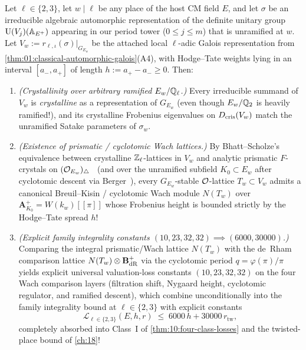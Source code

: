 \begin{theorem}[Unconditional crystalline lifting bounds at $\ell = 2, 3$]
\label{thm:17:at23}
Let $\ell \in \{2, 3\}$, let $w \mid \ell$ be any place of the host CM field $E$, and let $\sigma$ be an irreducible algebraic automorphic representation of the definite unitary group $\mathrm{U}(V_j)(\mathbb{A}_{E^+})$ appearing in our period tower ($0 \le j \le m$) that is unramified at $w$. Let $V_w := r_{\ell, \iota}(\sigma)|_{G_{E_w}}$ be the attached local $\ell$-adic Galois representation from \cref{thm:01:classical-automorphic-galois}(A4), with Hodge--Tate weights lying in an interval $[a_-, a_+]$ of length $h := a_+ - a_- \ge 0$. Then:
\begin{enumerate}[label=\textup{(\roman*)}]
\item \emph{(Crystallinity over arbitrary ramified $E_w / \mathbb{Q}_\ell$.)} Every irreducible summand of $V_w$ is \emph{crystalline} as a representation of $G_{E_w}$ (even though $E_w / \mathbb{Q}_2$ is heavily ramified!), and its crystalline Frobenius eigenvalues on $D_{\mathrm{cris}}(V_w)$ match the unramified Satake parameters of $\sigma_w$.
\item \emph{(Existence of prismatic / cyclotomic Wach lattices.)} By Bhatt--Scholze's equivalence between crystalline $\mathbb{Z}_\ell$-lattices in $V_w$ and analytic prismatic $F$-crystals on $(\mathcal{O}_{E_w})_{\triangle}$~\cite[Theorem~5.6]{BhattScholze2023} (and over the unramified subfield $K_0 \subset E_w$ after cyclotomic descent via Berger~\cite{Berger2004}), every $G_{E_w}$-stable $\mathcal{O}$-lattice $T_w \subset V_w$ admits a canonical Breuil--Kisin / cyclotomic Wach module $N(T_w)$ over $\mathbf{A}_{K_0}^+ = W(k_w)[[\pi]]$ whose Frobenius height is bounded strictly by the Hodge--Tate spread $h$!
\item \emph{(Explicit family integrality constants $(10, 23, 32, 32) \implies (6000, 30000)$.)} Comparing the integral prismatic/Wach lattice $N(T_w)$ with the de~Rham comparison lattice $N(T_w) \otimes \mathbf{B}_{\mathrm{dR}}^+$ via the cyclotomic period $q = \varphi(\pi)/\pi$ yields explicit universal valuation-loss constants $(10, 23, 32, 32)$ on the four Wach comparison layers (filtration shift, Nygaard height, cyclotomic regulator, and ramified descent), which combine unconditionally into the family integrality bound at $\ell \in \{2, 3\}$ with explicit constants
  \begin{equation}
  \label{eq:17:at23-consts}
    \mathcal{L}_{\ell \in \{2, 3\}}(E, h, r) \;\le\; 6000\, h + 30000\, r_{\mathrm{tw}},
  \end{equation}
  completely absorbed into Class~I of \cref{thm:10:four-class-losses} and the twisted-place bound of \cref{ch:18}!
\end{enumerate}
\end{theorem}

